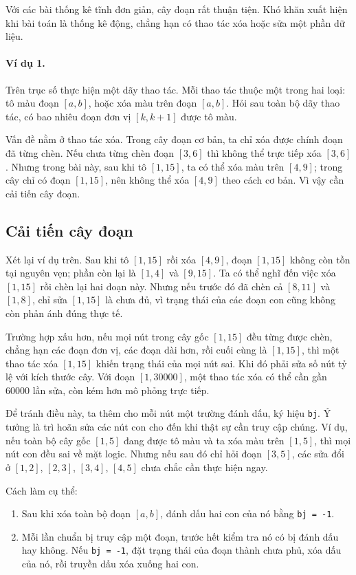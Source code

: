 \documentclass[11pt]{article}
\begin{document}
Với các bài thống kê tĩnh đơn giản, cây đoạn rất thuận tiện. Khó khăn xuất
hiện khi bài toán là thống kê động, chẳng hạn có thao tác xóa hoặc sửa một
phần dữ liệu.

\paragraph{Ví dụ 1.}
Trên trục số thực hiện một dãy thao tác. Mỗi thao tác thuộc một trong hai
loại: tô màu đoạn $[a,b]$, hoặc xóa màu trên đoạn $[a,b]$. Hỏi sau toàn bộ
dãy thao tác, có bao nhiêu đoạn đơn vị $[k,k+1]$ được tô màu.

Vấn đề nằm ở thao tác xóa. Trong cây đoạn cơ bản, ta chỉ xóa được chính đoạn
đã từng chèn. Nếu chưa từng chèn đoạn $[3,6]$ thì không thể trực tiếp xóa
$[3,6]$. Nhưng trong bài này, sau khi tô $[1,15]$, ta có thể xóa màu trên
$[4,9]$; trong cây chỉ có đoạn $[1,15]$, nên không thể xóa $[4,9]$ theo cách
cơ bản. Vì vậy cần cải tiến cây đoạn.

\subsection{Cải tiến cây đoạn}

Xét lại ví dụ trên. Sau khi tô $[1,15]$ rồi xóa $[4,9]$, đoạn $[1,15]$ không
còn tồn tại nguyên vẹn; phần còn lại là $[1,4]$ và $[9,15]$. Ta có thể nghĩ
đến việc xóa $[1,15]$ rồi chèn lại hai đoạn này. Nhưng nếu trước đó đã chèn
cả $[8,11]$ và $[1,8]$, chỉ sửa $[1,15]$ là chưa đủ, vì trạng thái của các
đoạn con cũng không còn phản ánh đúng thực tế.

Trường hợp xấu hơn, nếu mọi nút trong cây gốc $[1,15]$ đều từng được chèn,
chẳng hạn các đoạn đơn vị, các đoạn dài hơn, rồi cuối cùng là $[1,15]$, thì
một thao tác xóa $[1,15]$ khiến trạng thái của mọi nút sai. Khi đó phải sửa
số nút tỷ lệ với kích thước cây. Với đoạn $[1,30000]$, một thao tác xóa có
thể cần gần $60000$ lần sửa, còn kém hơn mô phỏng trực tiếp.

Để tránh điều này, ta thêm cho mỗi nút một trường đánh dấu, ký hiệu
\texttt{bj}. Ý tưởng là trì hoãn sửa các nút con cho đến khi thật sự cần truy
cập chúng. Ví dụ, nếu toàn bộ cây gốc $[1,5]$ đang được tô màu và ta xóa màu
trên $[1,5]$, thì mọi nút con đều sai về mặt logic. Nhưng nếu sau đó chỉ hỏi
đoạn $[3,5]$, các sửa đổi ở $[1,2]$, $[2,3]$, $[3,4]$, $[4,5]$ chưa chắc cần
thực hiện ngay.

Cách làm cụ thể:
\begin{enumerate}
  \item Sau khi xóa toàn bộ đoạn $[a,b]$, đánh dấu hai con của nó bằng
  \texttt{bj = -1}.
  \item Mỗi lần chuẩn bị truy cập một đoạn, trước hết kiểm tra nó có bị đánh
  dấu hay không. Nếu \texttt{bj = -1}, đặt trạng thái của đoạn thành chưa phủ,
  xóa dấu của nó, rồi truyền dấu xóa xuống hai con.
\end{enumerate}
\end{document}

